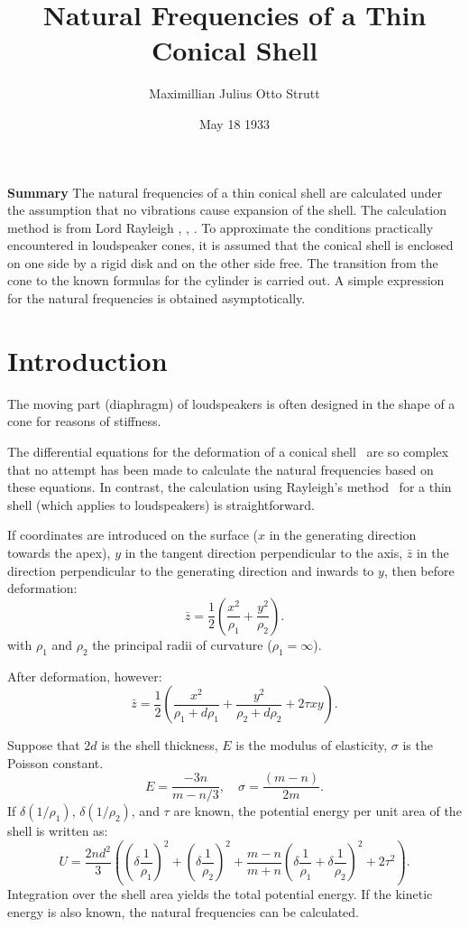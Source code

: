\documentclass[11pt]{amsart}
\author{Maximillian Julius Otto Strutt \cite{strutt_1933}}
\title{Natural Frequencies of a Thin Conical Shell}
\date{May 18 1933}
\begin{document}
\maketitle

\textbf{Summary}
The natural frequencies of a thin conical shell are calculated under the
assumption that no vibrations cause expansion of the shell.  The calculation
method is from Lord Rayleigh \cite[\S 235 f]{rayleigh_sound_v1_1945},
\cite[page 551]{rayleigh_1902}, \cite{rayleigh_1881}.  To approximate the
conditions practically encountered in loudspeaker cones, it is assumed that the
conical shell is enclosed on one side by a rigid disk and on the other side
free.  The transition from the cone to the known formulas for the cylinder is
carried out.  A simple expression for the natural frequencies is obtained asymptotically.

\setcounter{page}{729}

\section{Introduction}
The moving part (diaphragm) of loudspeakers is often designed in the shape of a
cone for reasons of stiffness.

The differential equations for the deformation of a conical
shell~\cite[page~603]{love_edition4} are so complex that no attempt has been
made to calculate the natural frequencies based on these equations.  In
contrast, the calculation using Rayleigh's method~\cite{rayleigh_1902} for a
thin shell (which applies to loudspeakers) is straightforward.

If coordinates are introduced on the surface (\(x\) in
the generating direction towards the apex), \(y\) in the
tangent direction perpendicular to the axis, \(\bar{z}\)
in the direction perpendicular to the generating
direction and inwards to \(y\), then before deformation:
\[
\bar{z}= \frac{1}{2}
\left(\frac{x^2}{\rho_1} + \frac{y^2}{\rho_2} \right).
\]
with \(\rho_1\) and \(\rho_2\) the principal radii of
curvature (\(\rho_1 = \infty\)).

After deformation, however:
\[
\bar{z} = \frac{1}{2} \left(
\frac{x^2}{\rho_1 + d\rho_1} +
\frac{y^2}{\rho_2 + d\rho_2} + 2\tau x y
\right).
\]

Suppose that \(2d\) is the shell thickness, \(E\) is the
modulus of elasticity, \(\sigma\) is the Poisson constant.
\[
E = \frac{-3n}{m - n/3}, \quad \sigma = \frac{(m - n)}{2m}.
\]
If \(\delta (1/\rho_1)\), \(\delta (1/\rho_2)\), and
\(\tau\) are known, the potential energy per unit area
of the shell is written as:
\begin{equation} \label{eq1}
U = \frac{2n d^2}{3} \left(
\left( \delta \frac{1}{\rho_1} \right)^2 +
\left( \delta \frac{1}{\rho_2} \right)^2 +
\frac{m-n}{m+n} \left(\delta \frac{1}{\rho_1} +
\delta \frac{1}{\rho_2}\right)^2 + 2 \tau^2 \right).
\end{equation}
Integration over the shell area yields the total
potential energy.  If the kinetic energy is also known,
the natural frequencies can be calculated.
\end{document}
